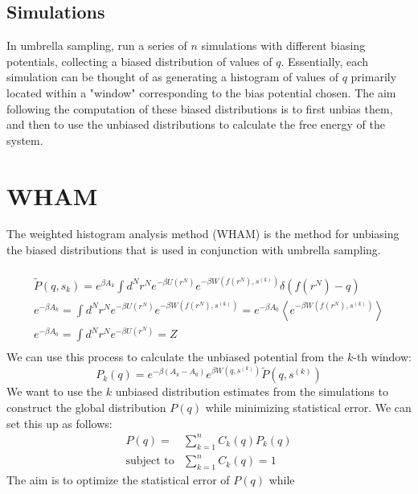 \documentclass{article}
\begin{document}
\subsection{Simulations}
In umbrella sampling, run a series of $n$ simulations with different biasing potentials, collecting a biased distribution of values of $q$.
Essentially, each simulation can be thought of as generating a histogram of values of $q$ primarily located within a "window" corresponding to the bias potential chosen.
The aim following the computation of these biased distributions is to first unbias them, and then to use the unbiased distributions to calculate the free energy of the system.

\section{WHAM}
The weighted histogram analysis method (WHAM) is the method for unbiasing the biased distributions that is used in conjunction with umbrella sampling.
\\\\
\begin{align*}
    \tilde{P}(q, s_k) = e^{\beta A_k} \int d^N r^N e^{-\beta U(r^N)} e^{- \beta W(f(r^N), s^{(k)})}\delta(f(r^N) - q) \\
    e^{-\beta A_k} = \int d^N r^N e^{-\beta U(r^N)} e^{-\beta W(f(r^N), s^{(k)})} = e^{-\beta A_0} \left \langle e^{- \beta W(f(r^N), s^{(k)})} \right \rangle\\
    e^{-\beta A_0} = \int d^N r^N e^{-\beta U(r^N)} = Z\\
\end{align*}
We can use this process to calculate the unbiased potential from the $k$-th window:
$$ P_k(q) = e^{-\beta(A_k - A_0)} e^{\beta W\left(q, s^{(k)}\right)} \tilde{P}(q, s^{(k)}) $$
We want to use the $k$ unbiased distribution estimates from the simulations to construct the global distribution $P(q)$ while minimizing statistical error.
We can set this up as follows:
\begin{align*}
    P(q) = &\sum_{k=1}^n C_k(q) P_k(q)\\
    \text{subject to} &\sum_{k=1}^n C_k(q) = 1
\end{align*}
The aim is to optimize the statistical error of $P(q)$ while 
\end{document}
